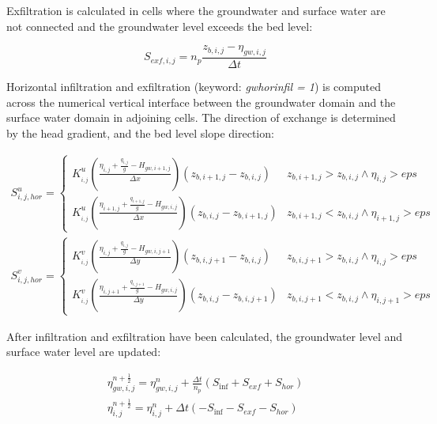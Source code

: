 \documentclass{article}
\begin{document}
\noindent Exfiltration is calculated in cells where the groundwater and surface water are not connected and the groundwater level exceeds the bed level:

\noindent 
\begin{equation} \label{6.11)} 
S_{exf,i,j} =n_{p} \frac{z_{b,i,j} -\eta _{gw,i,j} }{\Delta t}  
\end{equation} 


\noindent Horizontal infiltration and exfiltration (keyword: \textit{gwhorinfil = 1}) is computed across the numerical vertical interface between the groundwater domain and the surface water domain in adjoining cells. The direction of exchange is determined by the head gradient, and the bed level slope direction:

\noindent 
\begin{equation} \label{6.11)} 
\begin{array}{l} {S_{i,j,hor}^{u} =\left\{\begin{array}{cc} {K_{_{i,j} }^{u} \left(\frac{\eta _{i,j} +\frac{q_{i,j} }{g} -H_{gw,i+1,j} }{\Delta x} \right)\left(z_{b,i+1,j} -z_{b,i,j} \right)} & {z_{b,i+1,j} >z_{b,i,j} \wedge \eta _{i,j} >eps} \\ {K_{_{i,j} }^{u} \left(\frac{\eta _{i+1,j} +\frac{q_{i+1,j} }{g} -H_{gw,i,j} }{\Delta x} \right)\left(z_{b,i,j} -z_{b,i+1,j} \right)} & {z_{b,i+1,j} <z_{b,i,j} \wedge \eta _{i+1,j} >eps} \end{array}\right. } \\ {S_{i,j,hor}^{v} =\left\{\begin{array}{cc} {K_{_{i,j} }^{v} \left(\frac{\eta _{i,j} +\frac{q_{i,j} }{g} -H_{gw,i,j+1} }{\Delta y} \right)\left(z_{b,i,j+1} -z_{b,i,j} \right)} & {z_{b,i,j+1} >z_{b,i,j} \wedge \eta _{i,j} >eps} \\ {K_{_{i,j} }^{v} \left(\frac{\eta _{i,j+1} +\frac{q_{i,j+1} }{g} -H_{gw,i,j} }{\Delta y} \right)\left(z_{b,i,j} -z_{b,i,j+1} \right)} & {z_{b,i,j+1} <z_{b,i,j} \wedge \eta _{i,j+1} >eps} \end{array}\right. } \end{array} 
\end{equation} 
 

\noindent 

\noindent After infiltration and exfiltration have been calculated, the groundwater level and surface water level are updated:

\noindent 
\begin{equation} \label{6.11)} 
\begin{array}{l} {\eta _{gw,i,j}^{n+\frac{1}{2} } =\eta _{gw,i,j}^{n} +\frac{\Delta t}{n_{p} } \left(S_{\inf } +S_{exf} +S_{hor} \right)} \\ {\eta _{i,j}^{n+\frac{1}{2} } =\eta _{i,j}^{n} +\Delta t\left(-S_{\inf } -S_{exf} -S_{hor} \right)} \end{array} 
\end{equation} 
\end{document}
